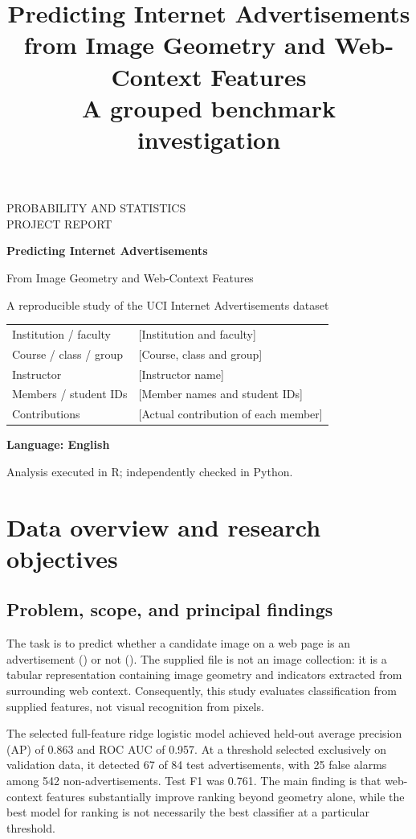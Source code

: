 \documentclass[11pt,a4paper]{article}
\title{Predicting Internet Advertisements from Image Geometry and Web-Context Features\\\large A grouped benchmark investigation}
\date{}
\newcommand{\code}[1]{\texttt{\detokenize{#1}}}
\begin{document}
\begin{titlepage}\centering
{\Large PROBABILITY AND STATISTICS\\PROJECT REPORT\par}\vspace{18mm}
{\huge\bfseries Predicting Internet Advertisements\par}\vspace{5mm}
{\Large From Image Geometry and Web-Context Features\par}\vspace{8mm}
{\large A reproducible study of the UCI Internet Advertisements dataset\par}\vspace{15mm}
\begin{minipage}{.92\textwidth}
\begin{tabular}{p{}p{}}
Institution / faculty & [Institution and faculty]\\[5mm]
Course / class / group & [Course, class and group]\\[5mm]
Instructor & [Instructor name]\\[5mm]
Members / student IDs & [Member names and student IDs]\\[5mm]
Contributions & [Actual contribution of each member]
\end{tabular}
\end{minipage}\vfill
\textbf{Language: English}\par
Analysis executed in R; independently checked in Python.\par
\end{titlepage}
\tableofcontents\newpage{}
\section{Data overview and research objectives}
\subsection{Problem, scope, and principal findings}
The task is to predict whether a candidate image on a web page is an advertisement (\code{ad}) or not (\code{nonad}). The supplied file is not an image collection: it is a tabular representation containing image geometry and indicators extracted from surrounding web context. Consequently, this study evaluates classification from supplied features, not visual recognition from pixels.

The selected full-feature ridge logistic model achieved held-out average precision (AP) of 0.863 and ROC AUC of 0.957. At a threshold selected exclusively on validation data, it detected 67 of 84 test advertisements, with 25 false alarms among 542 non-advertisements. Test F1 was 0.761. The main finding is that web-context features substantially improve ranking beyond geometry alone, while the best model for ranking is not necessarily the best classifier at a particular threshold.
\end{document}
